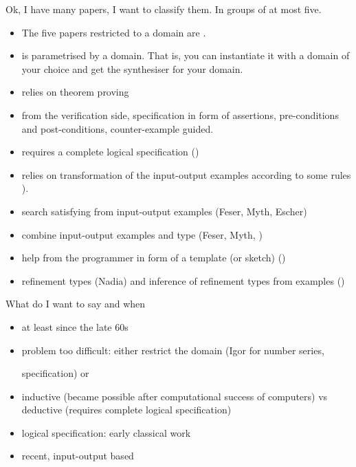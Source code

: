 Ok, I have many papers, I want to classify them. In groups of at most five.
\begin{itemize}
\item The five papers restricted to a domain are \cite{Fischer:2003:ASG:967842.967845,Frigo98fftw:an,Thies2002,Gulwani:2011:ASP:1926385.1926423,Gulwani:2011:SGC:1993498.1993505}.
\item \cite{Perelman:2014:TS:2594291.2594297} is parametrised by a domain. That is, you can instantiate it with a domain of your choice and get the synthesiser for your domain.
\item \cite{Manna:1980:DAP:357084.357090} relies on theorem proving
\item from the verification side, specification in form of assertions, pre-conditions and post-conditions, counter-example guided. \cite{LeonPaper,DBLP:journals/corr/InalaQLS15}
\item requires a complete logical specification (\cite{Kuncak:2010:CFS:1806596.1806632})
\item relies on transformation of the input-output examples according to some rules \cite{Summers:1977:MLP:321992.322002,Kitzelmann:2009:AIF:1530575.1530582}).
\item search satisfying from input-output examples (Feser, Myth, Escher)
\item combine input-output examples and type (Feser, Myth, \cite{Jha:2010:OCP:1806799.1806833})
\item help from the programmer in form of a template (or sketch) (\cite{Solar-Lezama:2006:CSF:1168857.1168907})
\item refinement types (Nadia) and inference of refinement types from examples (\cite{Frankle:2016:EST:2837614.2837629})
\end{itemize}

What do I want to say and when
\begin{itemize}
\item at least since the late 60s
\item problem too difficult: either restrict the domain (Igor for number series, 

specification)
or 
\item inductive (became possible after computational success of computers) vs deductive (requires complete logical specification)
\item logical specification:
early classical work 
\item recent, input-output based
\end{itemize}

